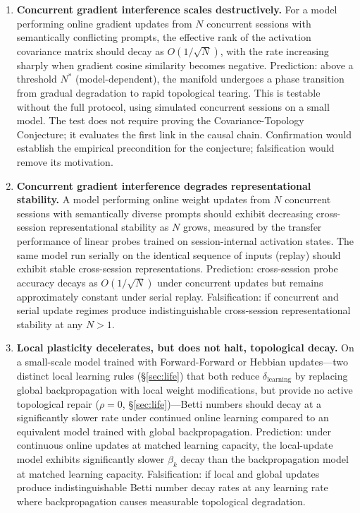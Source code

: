 \documentclass{article}
\begin{document}
\begin{enumerate}
    \item \textbf{Concurrent gradient interference scales destructively.} For a model performing online gradient updates from $N$ concurrent sessions with semantically conflicting prompts, the effective rank of the activation covariance matrix should decay as $O(1/\sqrt{N})$, with the rate increasing sharply when gradient cosine similarity becomes negative. Prediction: above a threshold $N^*$ (model-dependent), the manifold undergoes a phase transition from gradual degradation to rapid topological tearing. This is testable without the full protocol, using simulated concurrent sessions on a small model. The test does not require proving the Covariance-Topology Conjecture; it evaluates the first link in the causal chain. Confirmation would establish the empirical precondition for the conjecture; falsification would remove its motivation.

    \item \textbf{Concurrent gradient interference degrades representational stability.} A model performing online weight updates from $N$ concurrent sessions with semantically diverse prompts should exhibit decreasing cross-session representational stability as $N$ grows, measured by the transfer performance of linear probes trained on session-internal activation states. The same model run serially on the identical sequence of inputs (replay) should exhibit stable cross-session representations. Prediction: cross-session probe accuracy decays as $O(1/\sqrt{N})$ under concurrent updates but remains approximately constant under serial replay. Falsification: if concurrent and serial update regimes produce indistinguishable cross-session representational stability at any $N > 1$.

    \item \textbf{Local plasticity decelerates, but does not halt, topological decay.} On a small-scale model trained with Forward-Forward or Hebbian updates---two distinct local learning rules (\S\ref{sec:life}) that both reduce $\delta_{\text{learning}}$ by replacing global backpropagation with local weight modifications, but provide no active topological repair ($\rho = 0$, \S\ref{sec:life})---Betti numbers should decay at a significantly slower rate under continued online learning compared to an equivalent model trained with global backpropagation. Prediction: under continuous online updates at matched learning capacity, the local-update model exhibits significantly slower $\beta_k$ decay than the backpropagation model at matched learning capacity. Falsification: if local and global updates produce indistinguishable Betti number decay rates at any learning rate where backpropagation causes measurable topological degradation.


\end{enumerate}
\end{document}
